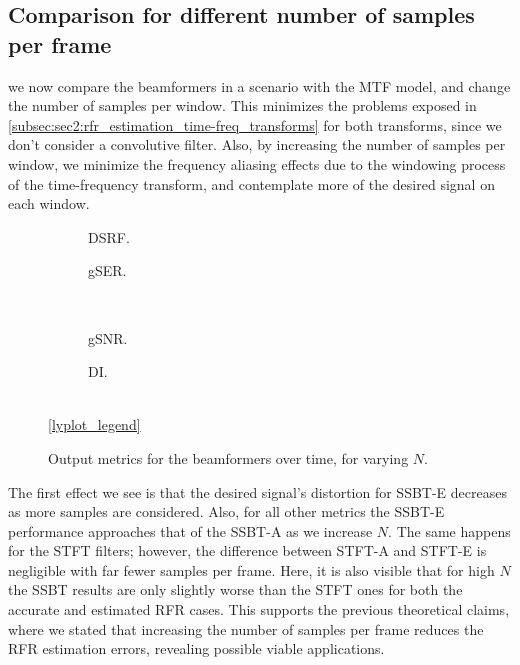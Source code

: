 
\subsection{Comparison for different number of samples per frame}

we now compare the beamformers in a scenario with the MTF model, and change the number of samples per window. This minimizes the problems exposed in \cref{subsec:sec2:rfr_estimation_time-freq_transforms} for both transforms, since we don't consider a convolutive filter. Also, by increasing the number of samples per window, we minimize the frequency aliasing effects due to the windowing process of the time-frequency transform, and contemplate more of the desired signal on each window.
\begin{figure}[!t]
	\centering
	\begin{subfigure}{0.49\textwidth}
		\centering
		
		\caption{DSRF.}
		\label{subfig:lineplot__DSRF__N_var__iSER_n15__Ly_1}
	\end{subfigure}\hfill
	\begin{subfigure}{0.49\textwidth}
		\centering
		
		\caption{gSER.}
		\label{subfig:lineplot__gSER__N_var__iSER_n15__Ly_1}
	\end{subfigure}\\[1em]
	\begin{subfigure}{0.49\textwidth}
		\centering
		
		\caption{gSNR.}
		\label{subfig:lineplot__gSNR__N_var__iSER_n15__Ly_1}
	\end{subfigure}\hfill
	\begin{subfigure}{0.49\textwidth}
		\centering
		
		\caption{DI.}
		\label{subfig:lineplot__DI__N_var__iSER_n15__Ly_1}
	\end{subfigure}\\[1em]
	\ref*{lyplot_legend}
	\caption{Output metrics for the beamformers over time, for varying $N$.}
	\label{fig:lineplot__N_var__iSER_n15__Ly_1}
\end{figure}

The first effect we see is that the desired signal's distortion for SSBT-E decreases as more samples are considered. Also, for all other metrics the SSBT-E performance approaches that of the SSBT-A as we increase $N$. The same happens for the STFT filters; however, the difference between STFT-A and STFT-E is negligible with far fewer samples per frame. Here, it is also visible that for high $N$ the SSBT results are only slightly worse than the STFT ones for both the accurate and estimated RFR cases. This supports the previous theoretical claims, where we stated that increasing the number of samples per frame reduces the RFR estimation errors, revealing possible viable applications.

